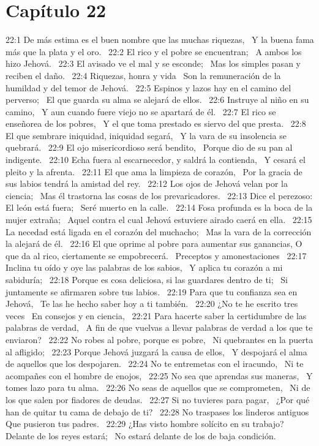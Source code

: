 \section*{Capítulo 22 }

22:1 De más estima es el buen nombre que las muchas riquezas,  
Y la buena fama más que la plata y el oro.  
22:2 El rico y el pobre se encuentran;  
A ambos los hizo Jehová.  
22:3 El avisado ve el mal y se esconde;  
Mas los simples pasan y reciben el daño.  
22:4 Riquezas, honra y vida  
Son la remuneración de la humildad y del temor de Jehová.  
22:5 Espinos y lazos hay en el camino del perverso;  
El que guarda su alma se alejará de ellos.  
22:6 Instruye al niño en su camino,  
Y aun cuando fuere viejo no se apartará de él.  
22:7 El rico se enseñorea de los pobres,  
Y el que toma prestado es siervo del que presta.  
22:8 El que sembrare iniquidad, iniquidad segará,  
Y la vara de su insolencia se quebrará.  
22:9 El ojo misericordioso será bendito,  
Porque dio de su pan al indigente.  
22:10 Echa fuera al escarnecedor, y saldrá la contienda,  
Y cesará el pleito y la afrenta.  
22:11 El que ama la limpieza de corazón,  
Por la gracia de sus labios tendrá la amistad del rey.  
22:12 Los ojos de Jehová velan por la ciencia;  
Mas él trastorna las cosas de los prevaricadores.  
22:13 Dice el perezoso: El león está fuera;  
Seré muerto en la calle.  
22:14 Fosa profunda es la boca de la mujer extraña;  
Aquel contra el cual Jehová estuviere airado caerá en ella.  
22:15 La necedad está ligada en el corazón del muchacho;  
Mas la vara de la corrección la alejará de él.  
22:16 El que oprime al pobre para aumentar sus ganancias, 
O que da al rico, ciertamente se empobrecerá.  
Preceptos y amonestaciones  
22:17 Inclina tu oído y oye las palabras de los sabios,  
Y aplica tu corazón a mi sabiduría;  
22:18 Porque es cosa deliciosa, si las guardares dentro de ti;  
Si juntamente se afirmaren sobre tus labios.  
22:19 Para que tu confianza sea en Jehová,  
Te las he hecho saber hoy a ti también.  
22:20 ¿No te he escrito tres veces  
En consejos y en ciencia,  
22:21 Para hacerte saber la certidumbre de las palabras de verdad,  
A fin de que vuelvas a llevar palabras de verdad a los que te enviaron?  
22:22 No robes al pobre, porque es pobre,  
Ni quebrantes en la puerta al afligido;  
22:23 Porque Jehová juzgará la causa de ellos,  
Y despojará el alma de aquellos que los despojaren.  
22:24 No te entremetas con el iracundo,  
Ni te acompañes con el hombre de enojos,  
22:25 No sea que aprendas sus maneras,  
Y tomes lazo para tu alma.  
22:26 No seas de aquellos que se comprometen,  
Ni de los que salen por fiadores de deudas.  
22:27 Si no tuvieres para pagar,  
¿Por qué han de quitar tu cama de debajo de ti?  
22:28 No traspases los linderos antiguos  
Que pusieron tus padres.  
22:29 ¿Has visto hombre solícito en su trabajo? Delante de los reyes estará;  
No estará delante de los de baja condición.  
